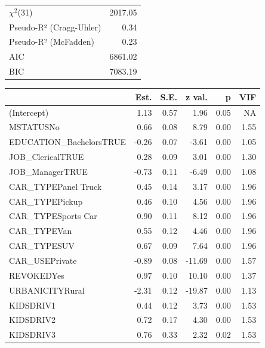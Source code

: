 \documentclass[]{article}
\begin{document}
\begin{table}[!h]
\centering
\begin{tabular}{lr}
\toprule
\rowcolor{gray!6}  $\chi^2$(31) & 2017.05\\
Pseudo-R² (Cragg-Uhler) & 0.34\\
\rowcolor{gray!6}  Pseudo-R² (McFadden) & 0.23\\
AIC & 6861.02\\
\rowcolor{gray!6}  BIC & 7083.19\\
\bottomrule
\end{tabular}
\end{table}

\begin{table}[!h]
\centering
\begin{threeparttable}
\begin{tabular}{lrrrrr}
\toprule
  & Est. & S.E. & z val. & p & VIF\\
\midrule
\rowcolor{gray!6}  (Intercept) & 1.13 & 0.57 & 1.96 & 0.05 & NA\\
MSTATUSNo & 0.66 & 0.08 & 8.79 & 0.00 & 1.55\\
\rowcolor{gray!6}  EDUCATION\_BachelorsTRUE & -0.26 & 0.07 & -3.61 & 0.00 & 1.05\\
JOB\_ClericalTRUE & 0.28 & 0.09 & 3.01 & 0.00 & 1.30\\
\rowcolor{gray!6}  JOB\_ManagerTRUE & -0.73 & 0.11 & -6.49 & 0.00 & 1.08\\
\addlinespace
CAR\_TYPEPanel Truck & 0.45 & 0.14 & 3.17 & 0.00 & 1.96\\
\rowcolor{gray!6}  CAR\_TYPEPickup & 0.46 & 0.10 & 4.56 & 0.00 & 1.96\\
CAR\_TYPESports Car & 0.90 & 0.11 & 8.12 & 0.00 & 1.96\\
\rowcolor{gray!6}  CAR\_TYPEVan & 0.55 & 0.12 & 4.46 & 0.00 & 1.96\\
CAR\_TYPESUV & 0.67 & 0.09 & 7.64 & 0.00 & 1.96\\
\addlinespace
\rowcolor{gray!6}  CAR\_USEPrivate & -0.89 & 0.08 & -11.69 & 0.00 & 1.57\\
REVOKEDYes & 0.97 & 0.10 & 10.10 & 0.00 & 1.37\\
\rowcolor{gray!6}  URBANICITYRural & -2.31 & 0.12 & -19.87 & 0.00 & 1.13\\
KIDSDRIV1 & 0.44 & 0.12 & 3.73 & 0.00 & 1.53\\
\rowcolor{gray!6}  KIDSDRIV2 & 0.72 & 0.17 & 4.30 & 0.00 & 1.53\\
\addlinespace
KIDSDRIV3 & 0.76 & 0.33 & 2.32 & 0.02 & 1.53\\

\end{tabular}
\end{threeparttable}
\end{table}
\end{document}
